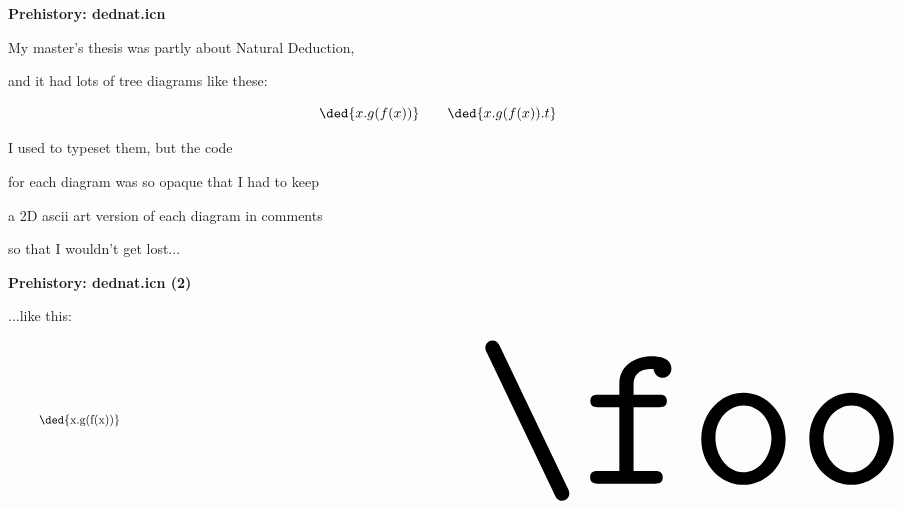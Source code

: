 \documentclass[oneside]{book}
\begin{document}
\newpage

\noedrxfooter


%                                                      

{\bf Prehistory: dednat.icn}

My master's thesis was partly about Natural Deduction,

and it had lots of tree diagrams like these:

%
\pu
$$\ded{x.g(f(x))} \qquad \ded{x.g(f(x)).t}$$

I used  to typeset them, but the code

for each diagram was so opaque that I had to keep

a 2D ascii art version of each diagram in comments

so that I wouldn't get lost...


\newpage


{\bf Prehistory: dednat.icn (2)}

...like this:

\msk



\pu

$\quad
 \vcenter{\ded{x.g(f(x))}}
 \qquad
 \vcenter{\resizebox{!}{120pt}{\foo}}
$


\newpage

\end{document}
